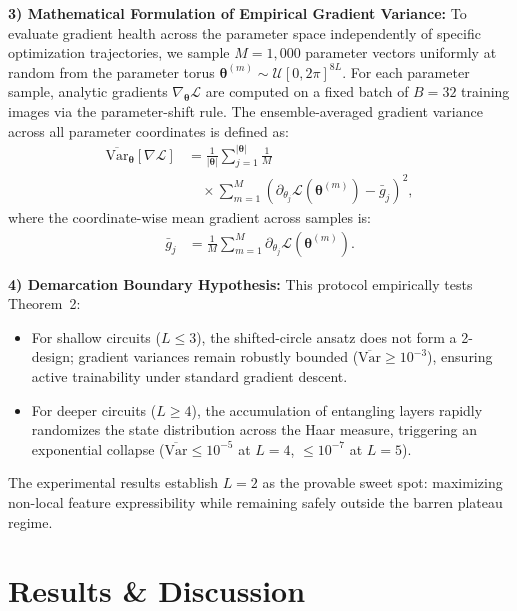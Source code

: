 \documentclass[journal]{IEEEtran}
\begin{document}
\textbf{3) Mathematical Formulation of Empirical Gradient Variance:}
To evaluate gradient health across the parameter space independently of specific optimization trajectories, we sample $M = 1{,}000$ parameter vectors uniformly at random from the parameter torus $\boldsymbol{\theta}^{(m)} \sim \mathcal{U}[0, 2\pi]^{8L}$. For each parameter sample, analytic gradients $\nabla_{\boldsymbol{\theta}} \mathcal{L}$ are computed on a fixed batch of $B = 32$ training images via the parameter-shift rule. The ensemble-averaged gradient variance across all parameter coordinates is defined as:
\begin{align}
\overline{\mathrm{Var}}_{\boldsymbol{\theta}}[\nabla \mathcal{L}] &= \frac{1}{|\boldsymbol{\theta}|} \sum_{j=1}^{|\boldsymbol{\theta}|} \frac{1}{M} \nonumber \\
&\quad \times \sum_{m=1}^{M} \left( \partial_{\theta_j} \mathcal{L}(\boldsymbol{\theta}^{(m)}) - \bar{g}_j \right)^2,
\label{eq:gradient_variance_metric}
\end{align}
where the coordinate-wise mean gradient across samples is:
\begin{align}
\bar{g}_j &= \frac{1}{M} \sum_{m=1}^{M} \partial_{\theta_j} \mathcal{L}(\boldsymbol{\theta}^{(m)}).
\label{eq:mean_gradient_def}
\end{align}

\textbf{4) Demarcation Boundary Hypothesis:}
This protocol empirically tests Theorem~2:
\begin{itemize}
    \item For shallow circuits ($L \le 3$), the shifted-circle ansatz does not form a 2-design; gradient variances remain robustly bounded ($\overline{\mathrm{Var}} \ge 10^{-3}$), ensuring active trainability under standard gradient descent.
    \item For deeper circuits ($L \ge 4$), the accumulation of entangling layers rapidly randomizes the state distribution across the Haar measure, triggering an exponential collapse ($\overline{\mathrm{Var}} \le 10^{-5}$ at $L = 4$, $\le 10^{-7}$ at $L = 5$).
\end{itemize}
The experimental results establish $L = 2$ as the provable sweet spot: maximizing non-local feature expressibility while remaining safely outside the barren plateau regime.

\section{Results \& Discussion}
\label{sec:results}
\end{document}
